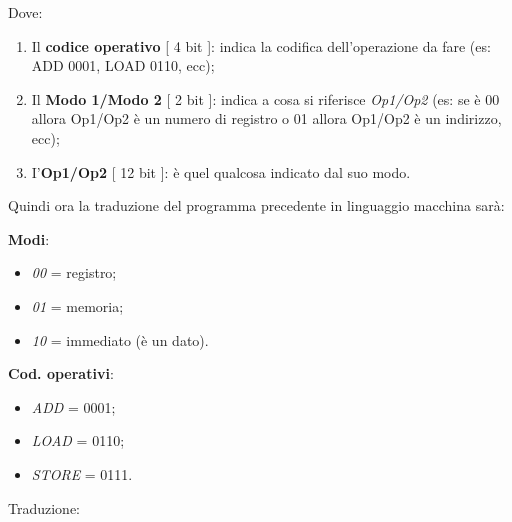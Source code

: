 Dove:

\begin{enumerate}
\def\labelenumi{\arabic{enumi}.}
\item
  Il \textbf{codice operativo} {[} 4 bit {]}: indica la codifica
  dell'operazione da fare (es: ADD 0001, LOAD 0110, ecc);
\item
  Il \textbf{Modo 1/Modo 2} {[} 2 bit {]}: indica a cosa si riferisce
  \emph{Op1/Op2} (es: se è 00 allora Op1/Op2 è un numero di registro o
  01 allora Op1/Op2 è un indirizzo, ecc);
\item
  I'\textbf{Op1/Op2} {[} 12 bit {]}: è quel qualcosa indicato dal suo
  modo.
\end{enumerate}

Quindi ora la traduzione del programma precedente in linguaggio macchina
sarà:

\textbf{Modi}:

\begin{itemize}
\item
  \emph{00} = registro;
\item
  \emph{01} = memoria;
\item
  \emph{10} = immediato (è un dato).
\end{itemize}

\textbf{Cod. operativi}:

\begin{itemize}
\item
  \emph{ADD} = 0001;
\item
  \emph{LOAD} = 0110;
\item
  \emph{STORE} = 0111.
\end{itemize}

Traduzione:


